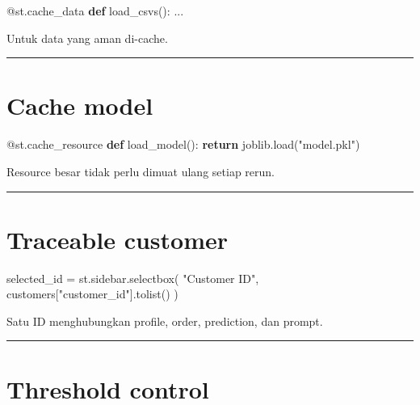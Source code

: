 \documentclass[
  indonesian,
  letterpaper,
  DIV=11,
  numbers=noendperiod]{scrreprt}
\newenvironment{Shaded}{\begin{snugshade}}{\end{snugshade}}
\newcommand{\AttributeTok}[1]{\textcolor[rgb]{0.40,0.45,0.13}{#1}}
\newcommand{\ControlFlowTok}[1]{\textcolor[rgb]{0.00,0.23,0.31}{\textbf{#1}}}
\newcommand{\KeywordTok}[1]{\textcolor[rgb]{0.00,0.23,0.31}{\textbf{#1}}}
\newcommand{\NormalTok}[1]{\textcolor[rgb]{0.00,0.23,0.31}{#1}}
\newcommand{\OperatorTok}[1]{\textcolor[rgb]{0.37,0.37,0.37}{#1}}
\newcommand{\StringTok}[1]{\textcolor[rgb]{0.13,0.47,0.30}{#1}}
\begin{document}
\begin{Shaded}
\begin{Highlighting}[]
\AttributeTok{@st.cache\_data}
\KeywordTok{def}\NormalTok{ load\_csvs():}
\NormalTok{    ...}
\end{Highlighting}
\end{Shaded}

Untuk data yang aman di-cache.

\begin{center}\rule{0.5\linewidth}{0.5pt}\end{center}

\section{Cache model}\label{cache-model}

\begin{Shaded}
\begin{Highlighting}[]
\AttributeTok{@st.cache\_resource}
\KeywordTok{def}\NormalTok{ load\_model():}
    \ControlFlowTok{return}\NormalTok{ joblib.load(}\StringTok{"model.pkl"}\NormalTok{)}
\end{Highlighting}
\end{Shaded}

Resource besar tidak perlu dimuat ulang setiap rerun.

\begin{center}\rule{0.5\linewidth}{0.5pt}\end{center}

\section{Traceable customer}\label{traceable-customer}

\begin{Shaded}
\begin{Highlighting}[]
\NormalTok{selected\_id }\OperatorTok{=}\NormalTok{ st.sidebar.selectbox(}
    \StringTok{"Customer ID"}\NormalTok{,}
\NormalTok{    customers[}\StringTok{"customer\_id"}\NormalTok{].tolist()}
\NormalTok{)}
\end{Highlighting}
\end{Shaded}

Satu ID menghubungkan profile, order, prediction, dan prompt.

\begin{center}\rule{0.5\linewidth}{0.5pt}\end{center}

\section{Threshold control}\label{threshold-control}
\end{document}
